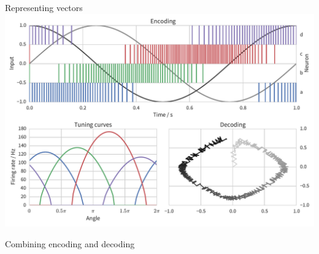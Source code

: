 \documentclass[t]{beamer}
\begin{document}
  \begin{frame}[plain]{Representing vectors}
    \vfill
    \includegraphics[width=\textwidth]{encoding_decoding2d}
    \vfill
  \end{frame}

  \begin{frame}{Combining encoding and decoding}
    
  \end{frame}





\end{document}
